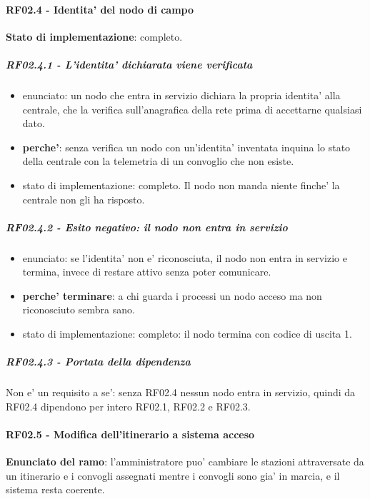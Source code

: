\documentclass[11pt]{article}
\begin{document}
\paragraph{RF02.4 - Identita' del nodo di campo}
\label{sec:org8166564}

\textbf{Stato di implementazione}: completo.
\subparagraph{RF02.4.1 - L'identita' dichiarata viene verificata}
\label{sec:org46d7f6c}
\begin{itemize}
\item enunciato: un nodo che entra in servizio dichiara la propria identita' alla centrale, che la
verifica sull'anagrafica della rete prima di accettarne qualsiasi dato.
\item \textbf{perche'}: senza verifica un nodo con un'identita' inventata inquina lo stato della centrale con
la telemetria di un convoglio che non esiste.
\item stato di implementazione: completo. Il nodo non manda niente finche' la centrale non gli ha
risposto.
\end{itemize}
\subparagraph{RF02.4.2 - Esito negativo: il nodo non entra in servizio}
\label{sec:orgb395392}
\begin{itemize}
\item enunciato: se l'identita' non e' riconosciuta, il nodo non entra in servizio e termina, invece di
restare attivo senza poter comunicare.
\item \textbf{perche' terminare}: a chi guarda i processi un nodo acceso ma non riconosciuto sembra sano.
\item stato di implementazione: completo: il nodo termina con codice di uscita 1.
\end{itemize}
\subparagraph{RF02.4.3 - Portata della dipendenza}
\label{sec:orge95463b}
Non e' un requisito a se': senza RF02.4 nessun nodo entra in servizio, quindi da RF02.4 dipendono
per intero RF02.1, RF02.2 e RF02.3.
\paragraph{RF02.5 - Modifica dell'itinerario a sistema acceso}
\label{sec:org3d6ef50}
\textbf{Enunciato del ramo}: l'amministratore puo' cambiare le stazioni attraversate da un itinerario e i
convogli assegnati mentre i convogli sono gia' in marcia, e il sistema resta coerente.
\end{document}
